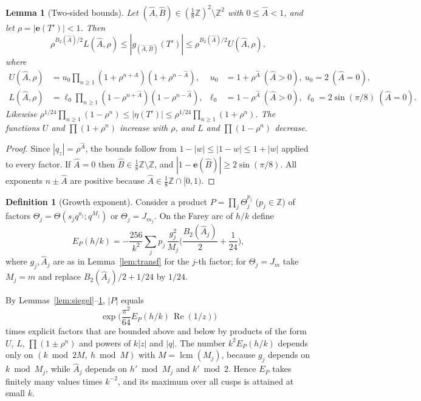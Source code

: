 \documentclass[11pt]{amsart}
\newtheorem{lemma}[theorem]{Lemma}
\theoremstyle{definition}
\newtheorem{definition}[theorem]{Definition}
\theoremstyle{remark}
\numberwithin{equation}{section}
\newcommand{\e}{\mathbf{e}}
\newcommand{\Z}{\mathbb{Z}}
\newcommand{\re}{\operatorname{Re}}
\newcommand{\Ahat}{\widehat{A}}
\newcommand{\Bhat}{\widehat{B}}
\begin{document}
\begin{lemma}[Two-sided bounds]\label{lem:bounds}
Let $(\Ahat,\Bhat)\in(\frac18\Z)^2\setminus\Z^2$ with $0\le\Ahat<1$, and let $\rho=|\e(T')|<1$.
Then
\[
\rho^{B_2(\Ahat)/2}L(\Ahat,\rho)\le|g_{(\Ahat,\Bhat)}(T')|\le\rho^{B_2(\Ahat)/2}U(\Ahat,\rho),
\]
where
\begin{align*}
U(\Ahat,\rho)&=u_0\prod_{n\ge1}(1+\rho^{n+\Ahat})(1+\rho^{n-\Ahat}),&u_0&=1+\rho^{\Ahat}\ (\Ahat>0),\ u_0=2\ (\Ahat=0),\\
L(\Ahat,\rho)&=\ell_0\prod_{n\ge1}(1-\rho^{n+\Ahat})(1-\rho^{n-\Ahat}),&\ell_0&=1-\rho^{\Ahat}\ (\Ahat>0),\ \ell_0=2\sin(\pi/8)\ (\Ahat=0).
\end{align*}
Likewise $\rho^{1/24}\prod_{n\ge1}(1-\rho^n)\le|\eta(T')|\le\rho^{1/24}\prod_{n\ge1}(1+\rho^n)$.
The functions $U$ and $\prod(1+\rho^n)$ increase with $\rho$, and $L$ and $\prod(1-\rho^n)$ decrease.
\end{lemma}

\begin{proof}
Since $|q_z|=\rho^{\Ahat}$, the bounds follow from $1-|w|\le|1-w|\le1+|w|$ applied to every factor.
If $\Ahat=0$ then $\Bhat\in\frac18\Z\setminus\Z$, and $|1-\e(\Bhat)|\ge2\sin(\pi/8)$.
All exponents $n\pm\Ahat$ are positive because $\Ahat\in\frac18\Z\cap[0,1)$.
\end{proof}

\begin{definition}[Growth exponent]\label{def:E}
Consider a product $P=\prod_j\Theta_j^{p_j}$ ($p_j\in\Z$) of factors $\Theta_j=\Theta(s_jq^{a_j};q^{M_j})$ or $\Theta_j=J_{m_j}$.
On the Farey arc of $h/k$ define
\[
E_P(h/k)=-\frac{256}{k^2}\sum_j p_j\,\frac{g_j^2}{M_j}\Big(\frac{B_2(\Ahat_j)}2+\frac1{24}\Big),
\]
where $g_j,\Ahat_j$ are as in Lemma~\ref{lem:transf} for the $j$-th factor; for $\Theta_j=J_m$ take $M_j=m$ and replace $B_2(\Ahat_j)/2+1/24$ by $1/24$.
\end{definition}

By Lemmas~\ref{lem:siegel}--\ref{lem:bounds}, $|P|$ equals
\[
\exp\Big(\frac{\pi^2}{64}E_P(h/k)\,\re(1/z)\Big)
\]
times explicit factors that are bounded above and below by products of the form $U$, $L$, $\prod(1\pm\rho^n)$ and powers of $k|z|$ and $|q|$.
The number $k^2E_P(h/k)$ depends only on $(k\bmod 2M,\ h\bmod M)$ with $M=\operatorname{lcm}(M_j)$, because $g_j$ depends on $k\bmod M_j$, while $\Ahat_j$ depends on $h'\bmod M_j$ and $k'\bmod2$.
Hence $E_P$ takes finitely many values times $k^{-2}$, and its maximum over all cusps is attained at small $k$.
\end{document}
